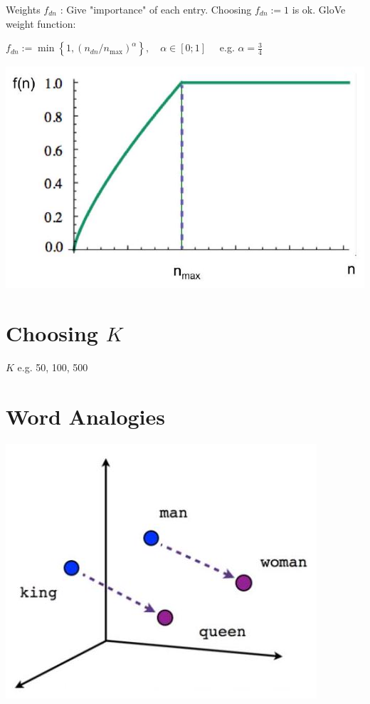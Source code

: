\documentclass[10pt]{article}
\begin{document}
Weights $f_{d n}$ : Give "importance" of each entry. Choosing $f_{d n}:=1$ is ok. GloVe weight function:

$f_{d n}:=\min \left\{1,\left(n_{d n} / n_{\max }\right)^{\alpha}\right\}, \quad \alpha \in[0 ; 1] \quad$ e.g. $\alpha=\frac{3}{4}$

\begin{center}
\includegraphics[max width=\textwidth]{2023_12_29_a68c38042b8470fb184bg-05}
\end{center}

\section*{Choosing $K$}
$K$ e.g. 50, 100, 500

\section*{Word Analogies}
\begin{center}
\includegraphics[max width=\textwidth]{2023_12_29_a68c38042b8470fb184bg-06(1)}
\end{center}
\end{document}
